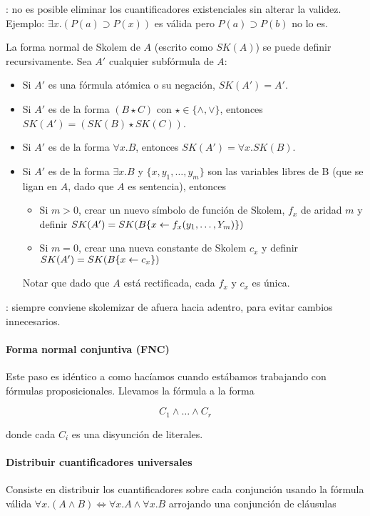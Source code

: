 : no es posible eliminar los cuantificadores existenciales sin alterar la validez. Ejemplo: $\exists x. (P(a) \supset P(x))$ es válida pero $P(a) \supset P(b)$ no lo es.

La forma normal de Skolem de $A$ (escrito como $SK(A)$) se puede definir recursivamente. Sea $A'$ cualquier subfórmula de $A$:
\begin{itemize}
  \item Si $A'$ es una fórmula atómica o su negación, $SK(A') = A'$.
  \item Si $A'$ es de la forma $(B \star C)$ con $\star \in \{\land, \lor\}$, entonces $SK(A') = (SK(B) \star SK(C))$.
  \item Si $A'$ es de la forma $\forall x.B$, entonces $SK(A') = \forall x.SK(B)$.
  \item Si $A'$ es de la forma $\exists x.B$ y $\{x, y_1, \dots, y_m\}$ son las variables libres de B (que se ligan en $A$, dado que $A$ es sentencia), entonces
    \begin{itemize}
      \item Si $m > 0$, crear un nuevo símbolo de función de Skolem, $f_x$ de aridad $m$ y definir $SK(A') = SK(B\{x \leftarrow f_x(y_1, \dots, Y_m)\})$
      \item Si $m = 0$, crear una nueva constante de Skolem $c_x$ y definir $SK(A') = SK(B\{x \leftarrow c_x\})$
    \end{itemize}
    Notar que dado que $A$ está rectificada, cada $f_x$ y $c_x$ es única.
\end{itemize}

: siempre conviene skolemizar de afuera hacia adentro, para evitar cambios innecesarios.

\paragraph{Forma normal conjuntiva (FNC)}

Este paso es idéntico a como hacíamos cuando estábamos trabajando con fórmulas proposicionales. Llevamos la fórmula a la forma

\[C_1 \land \dots \land C_r\]

 donde cada $C_i$ es una disyunción de literales.

\paragraph{Distribuir cuantificadores universales}

Consiste en distribuir los cuantificadores sobre cada conjunción usando la fórmula válida $\forall x.(A\land B) \iff \forall x. A \land \forall x. B$ arrojando una conjunción de cláusulas

